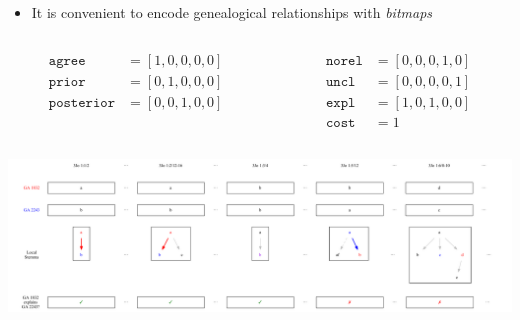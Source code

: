 \documentclass[10pt]{beamer}
\begin{document}
	\begin{frame}
		\begin{itemize}
			\item It is convenient to encode genealogical relationships with \emph{bitmaps}
		\end{itemize}
		\begin{columns}
			\begin{column}{0.45\textwidth}
				\begin{align*}
					\mathtt{agree} &= [1,0,0,0,0]\\
					\mathtt{prior} &= [0,1,0,0,0]\\
					\mathtt{posterior} &= [0,0,1,0,0]\\
					\phantom{*}
				\end{align*}
			\end{column}
			\begin{column}{0.45\textwidth}
				\begin{align*}
					\mathtt{norel} &= [0,0,0,1,0]\\
					\mathtt{uncl} &= [0,0,0,0,1]\\
					\mathtt{expl} &= [1,0,1,0,0]\\
					\mathtt{cost} &= 1
				\end{align*}
			\end{column}
		\end{columns}
		\begin{center}
			\includegraphics[width=1.125\textwidth]{../img/explained-readings.pdf}
		\end{center}
	\end{frame}
\end{document}
